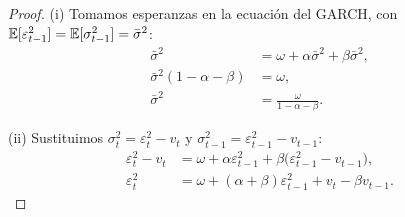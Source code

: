 \begin{proof}
(i) Tomamos esperanzas en la ecuación del GARCH, con $\mathbb{E}[\varepsilon_{t-1}^2]=\mathbb{E}[\sigma_{t-1}^2]=\bar\sigma^2$:
\begin{align*}
  \bar\sigma^2 &= \omega+\alpha\bar\sigma^2+\beta\bar\sigma^2,\\
  \bar\sigma^2(1-\alpha-\beta) &= \omega,\\
  \bar\sigma^2 &= \frac{\omega}{1-\alpha-\beta}.
\end{align*}

(ii) Sustituimos $\sigma_t^2=\varepsilon_t^2-v_t$ y $\sigma_{t-1}^2=\varepsilon_{t-1}^2-v_{t-1}$:
\begin{align*}
  \varepsilon_t^2-v_t &= \omega+\alpha\varepsilon_{t-1}^2+\beta\bigl(\varepsilon_{t-1}^2-v_{t-1}\bigr),\\
  \varepsilon_t^2     &= \omega+(\alpha+\beta)\varepsilon_{t-1}^2+v_t-\beta v_{t-1}.
\end{align*}


\end{proof}
